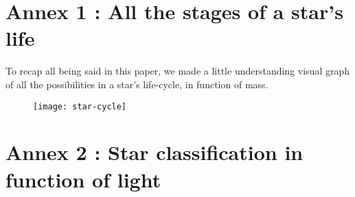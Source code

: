 \documentclass[a4paper, 11pt]{article} %
\begin{document}
\newpage



\section*{Annex 1 : All the stages of a star's life}

To recap all being said in this paper, we made a little understanding visual graph of all the possibilities in a star's life-cycle, in function of mass.



\begin{figure}[h]
\centering


\texttt{[image: star-cycle]}
\end{figure}
\newpage
\section*{Annex 2 : Star classification in function of light}
\end{document}
